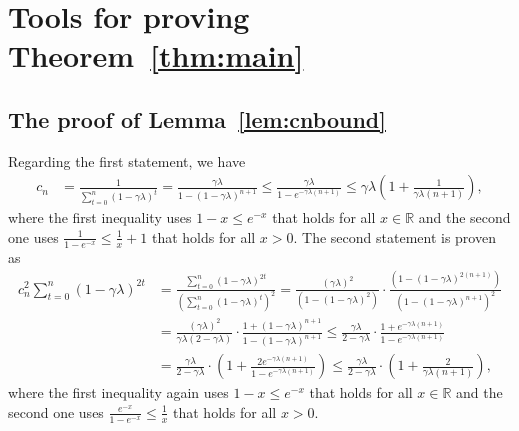 \documentclass[final,12pt]{colt2018} %
\newcommand{\real}{\mathbb{R}}
\newcommand{\pa}[1]{\left(#1\right)}
\begin{document}
\section{Tools for proving Theorem~\ref{thm:main}}\label{app:proofs}

\subsection{The proof of Lemma~\ref{lem:cnbound}}\label{app:cnbound}
Regarding the first statement, we have
\begin{align*}
 c_n &= \frac{1}{\sum_{t=0}^n (1-\gamma\lambda)^t} = \frac{\gamma\lambda}{1 - (1-\gamma\lambda)^{n+1}}
 \le \frac{\gamma\lambda}{1 - e^{-\gamma\lambda\pa{n+1}}} \le \gamma\lambda \pa{1 + \frac{1}{\gamma\lambda\pa{n+1}}},
\end{align*}
where the first inequality uses $1-x\le e^{-x}$ that holds for all $x\in\real$ and the second one uses $\frac{1}{1-e^{-x}} \le \frac 1x + 
1$ that holds for all $x>0$.
The second statement is proven as
\begin{align*}
 c_n^2 \sum_{t=0}^n \pa{1-\gamma\lambda}^{2t} &= \frac{\sum_{t=0}^n \pa{1-\gamma\lambda}^{2t} }{\pa{\sum_{t=0}^n 
(1-\gamma\lambda)^t}^2} = \frac{\pa{\gamma\lambda}^2 }{\pa{1-\pa{1-\gamma\lambda}^2}}\cdot\frac{\pa{1 - 
(1-\gamma\lambda)^{2\pa{n+1}}}}{\pa{1 - 
(1-\gamma\lambda)^{n+1}}^2}
\\
&=
\frac{\pa{\gamma\lambda}^2 }{\gamma\lambda\pa{2-\gamma\lambda}} \cdot \frac{1 + (1-\gamma\lambda)^{n+1}}{1 - (1-\gamma\lambda)^{n+1}} 
\le
\frac{\gamma\lambda}{2-\gamma\lambda} \cdot \frac{1 + e^{-\gamma\lambda\pa{n+1}}}{1 - e^{-\gamma\lambda \pa{n+1}}}
\\
&=
\frac{\gamma\lambda}{2-\gamma\lambda} \cdot \pa{1 + \frac{2 e^{-\gamma\lambda\pa{n+1}}}{1 - e^{-\gamma\lambda \pa{n+1}}}}
\le
\frac{\gamma\lambda}{2-\gamma\lambda} \cdot \pa{1 + \frac{2}{\gamma\lambda \pa{n+1}}},
\end{align*}
where the first inequality again uses $1-x\le e^{-x}$ that holds for all $x\in\real$ and the second one uses $\frac{e^{-x}}{1-e^{-x}} \le 
\frac 1x$ that holds for all $x>0$.
\jmlrQED
\end{document}
